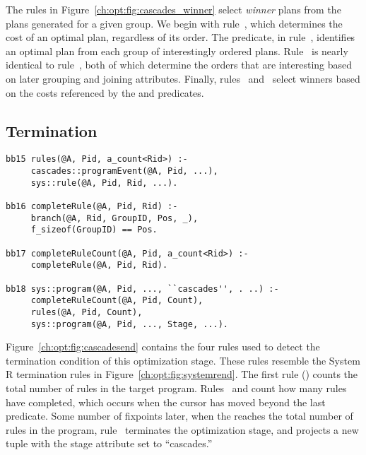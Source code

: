 The rules in Figure~\ref{ch:opt:fig:cascades_winner} select {\em winner} plans
from the plans generated for a given group.  We begin with rule~,
which determines the cost of an optimal plan, regardless of its order.  The
 predicate, in rule~, identifies an optimal plan
from each group of interestingly ordered plans.  Rule~ is nearly
identical to rule~, both of which determine the orders that are
interesting based on later grouping and joining attributes.  Finally,
rules~ and~ select winners based on the costs referenced by
the  and  predicates.


\subsection{Termination}
\label{ch:opt:sec:cascadesend}

\begin{figure*}
\ssp
\centering
\begin{lstlisting}
bb15 rules(@A, Pid, a_count<Rid>) :-
     cascades::programEvent(@A, Pid, ...),
     sys::rule(@A, Pid, Rid, ...).

bb16 completeRule(@A, Pid, Rid) :-
     branch(@A, Rid, GroupID, Pos, _),
     f_sizeof(GroupID) == Pos.

bb17 completeRuleCount(@A, Pid, a_count<Rid>) :-
     completeRule(@A, Pid, Rid).

bb18 sys::program(@A, Pid, ..., ``cascades'', . ..) :-
     completeRuleCount(@A, Pid, Count),
     rules(@A, Pid, Count),
     sys::program(@A, Pid, ..., Stage, ...).
\end{lstlisting}
\caption{\label{ch:opt:fig:cascadesend}Cascades termination rules.}
\end{figure*}

Figure~\ref{ch:opt:fig:cascadesend} contains the four rules used to detect the
termination condition of this optimization stage.  These rules resemble the
System R termination rules in Figure~\ref{ch:opt:fig:systemrend}.  The first
rule () counts the total number of rules in the target program.
Rules~ and  count how many rules have completed, which occurs
when the  cursor has moved beyond the last predicate.  Some number
of fixpoints later, when the  reaches the total number of
rules in the program, rule~ terminates the optimization stage, and
projects a new  tuple with the stage attribute set to
``cascades.''


